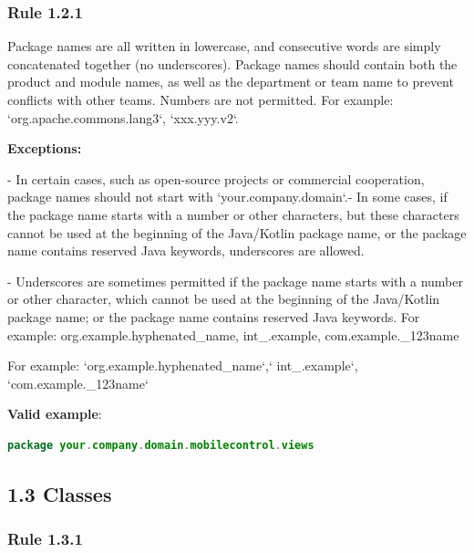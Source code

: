 \subsubsection*{\textbf{Rule 1.2.1}}
\leavevmode\newline

Package names are all written in lowercase, and consecutive words are simply concatenated together (no underscores). Package names should contain both the product and module names, as well as the department or team name to prevent conflicts with other teams.  Numbers are not permitted. For example: `org.apache.commons.lang3`, `xxx.yyy.v2`.



\textbf{Exceptions:}



- In certain cases, such as open-source projects or commercial cooperation, package names should not start with `your.company.domain`.- In some cases, if the package name starts with a number or other characters, but these characters cannot be used at the beginning of the Java/Kotlin package name, or the package name contains reserved Java keywords, underscores are allowed.

- Underscores are sometimes permitted if the package name starts with a number or other character, which cannot be used at the beginning of the Java/Kotlin package name; or the package name contains reserved Java keywords. For example: org.example.hyphenated\_name, int\_.example, com.example.\_123name

For example: `org.example.hyphenated\_name`,` int\_.example`, `com.example.\_123name`



\textbf{Valid example}:

\begin{lstlisting}[language=Kotlin]
package your.company.domain.mobilecontrol.views
\end{lstlisting}


\subsection*{\textbf{1.3 Classes}}

\subsubsection*{\textbf{Rule 1.3.1}}
\leavevmode\newline



